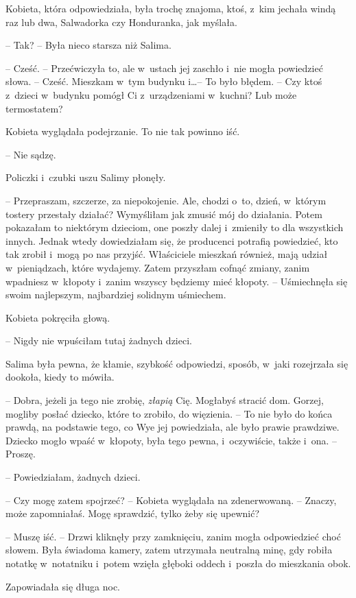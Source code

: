 \documentclass[oneside,polish,11pt,sfheadings]{mwbk}
\begin{document}
Kobieta, która odpowiedziała, była trochę znajoma, ktoś, z~kim jechała
windą raz lub dwa, Salwadorka czy Honduranka, jak myślała. 

-- Tak? -- Była
nieco starsza niż Salima.

-- Cześć. -- Przećwiczyła to, ale w~ustach jej zaschło i~nie mogła
powiedzieć słowa. -- Cześć. Mieszkam w~tym budynku i\ldots  -- To było błędem. -- Czy ktoś z~dzieci w~budynku pomógł Ci z~urządzeniami w~kuchni? Lub
może termostatem?

Kobieta wyglądała podejrzanie. To nie tak powinno iść. 

-- Nie sądzę.

Policzki i~czubki uszu Salimy płonęły. 

-- Przepraszam, szczerze, za
niepokojenie. Ale, chodzi o~to, dzień, w~którym tostery przestały
działać? Wymyśliłam jak zmusić mój do działania. Potem pokazałam to
niektórym dzieciom, one poszły dalej i~zmieniły to dla wszystkich
innych. Jednak wtedy dowiedziałam się, że producenci potrafią
powiedzieć, kto tak zrobił i~mogą po nas przyjść. Właściciele mieszkań
również, mają udział w~pieniądzach, które wydajemy. Zatem przyszłam
cofnąć zmiany, zanim wpadniesz w~kłopoty i~zanim wszyscy będziemy mieć
kłopoty. -- Uśmiechnęła się swoim najlepszym, najbardziej solidnym
uśmiechem.

Kobieta pokręciła głową. 

-- Nigdy nie wpuściłam tutaj żadnych dzieci.

Salima była pewna, że kłamie, szybkość odpowiedzi, sposób, w~jaki
rozejrzała się dookoła, kiedy to mówiła. 

-- Dobra, jeżeli ja tego nie
zrobię, \textit{złapią} Cię. Mogłabyś stracić dom. Gorzej, mogliby posłać
dziecko, które to zrobiło, do więzienia. -- To nie było do końca prawdą,
na podstawie tego, co Wye jej powiedziała, ale było prawie prawdziwe.
Dziecko mogło wpaść w~kłopoty, była tego pewna, i~oczywiście, także i~ona. -- Proszę.

-- Powiedziałam, żadnych dzieci.

-- Czy mogę zatem spojrzeć? -- Kobieta wyglądała na zdenerwowaną. -- Znaczy, może zapomniałaś. Mogę sprawdzić, tylko żeby się upewnić?

-- Muszę iść. -- Drzwi kliknęły przy zamknięciu, zanim mogła odpowiedzieć
choć słowem. Była świadoma kamery, zatem utrzymała neutralną minę, gdy
robiła notatkę w~notatniku i~potem wzięła głęboki oddech i~poszła do
mieszkania obok.

Zapowiadała się długa noc.
\end{document}
